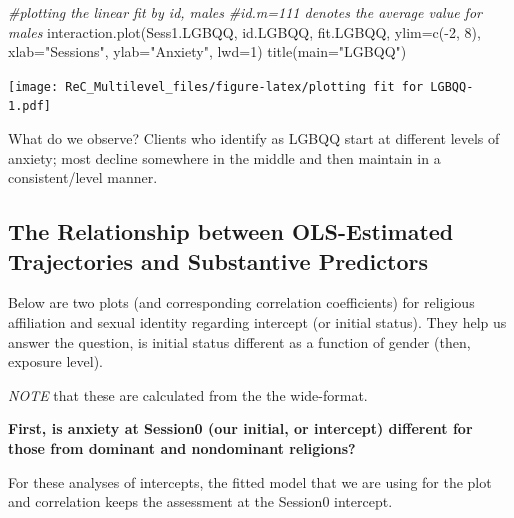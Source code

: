 \documentclass[
  english,
]{book}
\newenvironment{Shaded}{\begin{snugshade}}{\end{snugshade}}
\newcommand{\AttributeTok}[1]{\textcolor[rgb]{0.77,0.63,0.00}{#1}}
\newcommand{\CommentTok}[1]{\textcolor[rgb]{0.56,0.35,0.01}{\textit{#1}}}
\newcommand{\DecValTok}[1]{\textcolor[rgb]{0.00,0.00,0.81}{#1}}
\newcommand{\FunctionTok}[1]{\textcolor[rgb]{0.00,0.00,0.00}{#1}}
\newcommand{\NormalTok}[1]{#1}
\newcommand{\SpecialCharTok}[1]{\textcolor[rgb]{0.00,0.00,0.00}{#1}}
\newcommand{\StringTok}[1]{\textcolor[rgb]{0.31,0.60,0.02}{#1}}
\begin{document}
\begin{Shaded}
\begin{Highlighting}[]
\CommentTok{\#plotting the linear fit by id, males}
\CommentTok{\#id.m=111 denotes the average value for males}
\FunctionTok{interaction.plot}\NormalTok{(Sess1.LGBQQ, id.LGBQQ, fit.LGBQQ, }\AttributeTok{ylim=}\FunctionTok{c}\NormalTok{(}\SpecialCharTok{{-}}\DecValTok{2}\NormalTok{, }\DecValTok{8}\NormalTok{), }\AttributeTok{xlab=}\StringTok{"Sessions"}\NormalTok{, }\AttributeTok{ylab=}\StringTok{"Anxiety"}\NormalTok{, }\AttributeTok{lwd=}\DecValTok{1}\NormalTok{)}
\FunctionTok{title}\NormalTok{(}\AttributeTok{main=}\StringTok{"LGBQQ"}\NormalTok{)}
\end{Highlighting}
\end{Shaded}

\texttt{[image: ReC\_Multilevel\_files/figure-latex/plotting fit for LGBQQ-1.pdf]}

What do we observe? Clients who identify as LGBQQ start at different levels of anxiety; most decline somewhere in the middle and then maintain in a consistent/level manner.

\hypertarget{the-relationship-between-ols-estimated-trajectories-and-substantive-predictors}{%
\subsection{The Relationship between OLS-Estimated Trajectories and Substantive Predictors}\label{the-relationship-between-ols-estimated-trajectories-and-substantive-predictors}}

Below are two plots (and corresponding correlation coefficients) for religious affiliation and sexual identity regarding intercept (or initial status). They help us answer the question, is initial status different as a function of gender (then, exposure level).

\emph{NOTE} that these are calculated from the the wide-format.

\textbf{First, is anxiety at Session0 (our initial, or intercept) different for those from dominant and nondominant religions?}

For these analyses of intercepts, the fitted model that we are using for the plot and correlation keeps the assessment at the Session0 intercept.

\begin{Shaded}
\end{Shaded}
\end{document}
